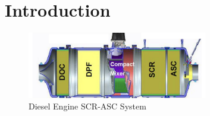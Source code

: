 \chapter{Introduction}
\begin{figure}[H]
        \centering
        \includegraphics[width = 0.7\textwidth]{Part3/figs/SCR-ASC_chamber.png}
        \caption{Diesel Engine SCR-ASC System}
        \label{fig::scr_chamber}
\end{figure}

